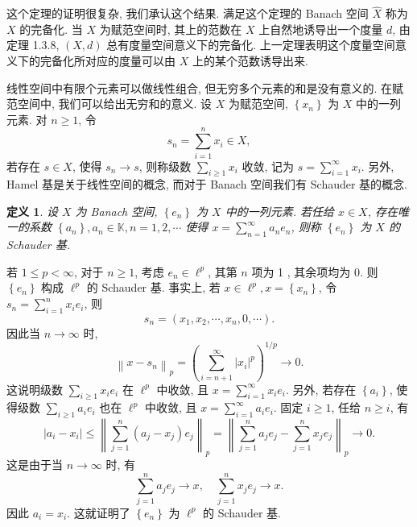 \documentclass[openany]{ctexbook}
\theoremstyle{kaiti}
\newtheorem{definition}{定义}[section]
\theoremstyle{normal}
\begin{document}
这个定理的证明很复杂, 我们承认这个结果. 满足这个定理的 Banach 空间 $\hat{X}$ 称为 $X$ 的完备化. 当 $X$ 为赋范空间时, 其上的范数在 $X$ 上自然地诱导出一个度量 $d$, 由定理 1.3.8, $(X, d)$ 总有度量空间意义下的完备化. 上一定理表明这个度量空间意义下的完备化所对应的度量可以由 $X$ 上的某个范数诱导出来.

线性空间中有限个元素可以做线性组合, 但无穷多个元素的和是没有意义的. 在赋范空间中, 我们可以给出无穷和的意义. 设 $X$ 为赋范空间, $\left\{x_n\right\}$ 为 $X$ 中的一列元素. 对 $n \geqslant 1$, 令
$$
s_n=\sum_{i=1}^n x_{i} \in X,
$$
若存在 $s \in X$, 使得 $s_n \rightarrow s$, 则称级数 $\sum_{i \geqslant 1} x_{i}$ 收敛, 记为 $s=\sum_{i=1}^{\infty} x_{i}$. 另外, Hamel 基是关于线性空间的概念, 而对于 Banach 空间我们有 Schauder 基的概念.

\begin{definition}
  设 $X$ 为 Banach 空间, $\left\{e_n\right\}$ 为 $X$ 中的一列元素. 若任给 $x \in X$, 存在唯一的系数 $\left\{a_n\right\}, a_n \in \mathbb{K}, n=1,2, \cdots$ 使得 $x=\sum_{n=1}^{\infty} a_n e_n$, 则称 $\left\{e_n\right\}$ 为 $X$ 的 Schauder 基.
\end{definition}

若 $1 \leqslant p<\infty$, 对于 $n \geqslant 1$, 考虑 $e_n \in \ell^{p}$, 其第 $n$ 项为 1 , 其余项均为 0. 则 $\left\{e_n\right\}$ 构成 $\ell^{p}$ 的 Schauder 基. 事实上, 若 $x \in \ell^{p}, x=\left\{x_n\right\}$, 令 $s_n=\sum_{i=1}^n x_{i} e_{i}$, 则
$$
s_n=\left(x_1, x_2, \cdots, x_n, 0, \cdots\right).
$$
因此当 $n \rightarrow \infty$ 时,
$$
\left\|x-s_n\right\|_{p}=\left(\sum_{i=n+1}^{\infty}\left|x_{i}\right|^{p}\right)^{1 / p} \rightarrow 0.
$$
这说明级数 $\sum_{i \geqslant 1} x_{i} e_{i}$ 在 $\ell^{p}$ 中收敛, 且 $x=\sum_{i=1}^{\infty} x_{i} e_{i}$. 另外, 若存在 $\left\{a_{i}\right\}$, 使得级数 $\sum_{i \geqslant 1} a_{i} e_{i}$ 也在 $\ell^{p}$ 中收敛, 且 $x=\sum_{i=1}^{\infty} a_{i} e_{i}$. 固定 $i \geqslant 1$, 任给 $n \geqslant i$, 有
$$
\left|a_{i}-x_{i}\right| \leqslant\left\|\sum_{j=1}^n\left(a_{j}-x_{j}\right) e_{j}\right\|_{p}=\left\|\sum_{j=1}^n a_{j} e_{j}-\sum_{j=1}^n x_{j} e_{j}\right\|_{p} \rightarrow 0.
$$
这是由于当 $n \rightarrow \infty$ 时, 有
$$
\sum_{j=1}^n a_{j} e_{j} \rightarrow x, \quad \sum_{j=1}^n x_{j} e_{j} \rightarrow x.
$$
因此 $a_{i}=x_{i}$. 这就证明了 $\left\{e_n\right\}$ 为 $\ell^{p}$ 的 Schauder 基.
\end{document}
